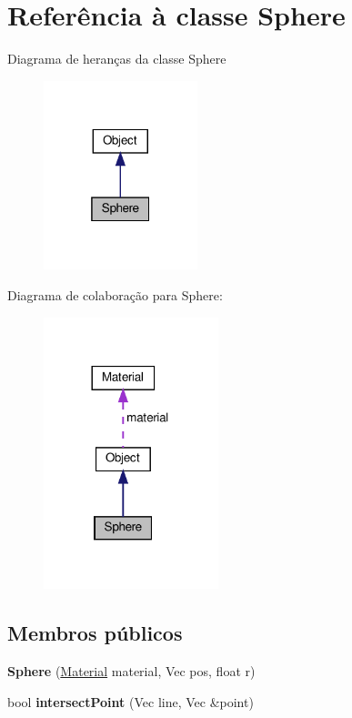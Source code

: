 \hypertarget{classSphere}{}\section{Referência à classe Sphere}
\label{classSphere}


Diagrama de heranças da classe Sphere\nopagebreak
\begin{figure}[H]
\begin{center}
\leavevmode
\includegraphics[width=127pt]{classSphere__inherit__graph}
\end{center}
\end{figure}


Diagrama de colaboração para Sphere\+:\nopagebreak
\begin{figure}[H]
\begin{center}
\leavevmode
\includegraphics[width=144pt]{classSphere__coll__graph}
\end{center}
\end{figure}
\subsection*{Membros públicos}
\begin{DoxyCompactItemize}
\item 
\mbox{\label{classSphere_a3cdbd5e616f29a25e11b2288623f4a27}} 
{\bfseries Sphere} (\hyperlink{classMaterial}{Material} material, Vec pos, float r)
\item 
\mbox{\label{classSphere_aef46fad76354a361e9cd191169f0ee0b}} 
bool {\bfseries intersect\+Point} (Vec line, Vec \&point)
\end{DoxyCompactItemize}
